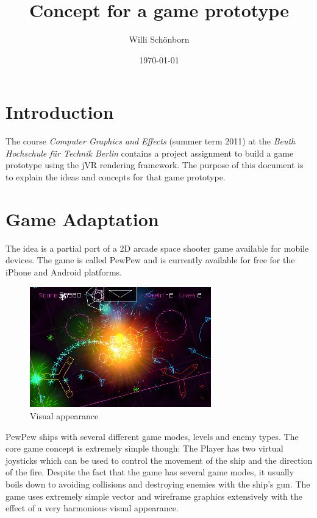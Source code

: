 \documentclass[a4paper]{article}
\title{Concept for a game prototype}
\author{Willi Schönborn}
\date{\today}
\begin{document}
\maketitle

\section*{Introduction}
The course \textit{Computer Graphics and Effects} (summer term 2011) at the \textit{Beuth Hochschule für Technik Berlin} contains a project assignment to build a game prototype using the jVR rendering framework. The purpose of this document is to explain the ideas and concepts for that game prototype.

\section*{Game Adaptation}
The idea is a partial port of a 2D arcade space shooter game available for mobile devices. The game is called PewPew and is currently available for free for the iPhone and Android platforms.

\begin{figure}[htbp]
\centering
\includegraphics[width=0.7\textwidth]{PewPew-iPhone-App-Review.jpg}
\caption{Visual appearance}
\end{figure}

PewPew ships with several different game modes, levels and enemy types. The core game concept is extremely simple though: The Player has two virtual joysticks which can be used to control the movement of the ship and the direction of the fire. Despite the fact that the game has several game modes, it usually boils down to avoiding collisions and destroying enemies with the ship's gun. The game uses extremely simple vector and wireframe graphics extensively with the effect of a very harmonious visual appearance.

\newpage
\end{document}
